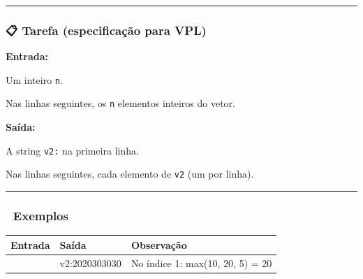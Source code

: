 \documentclass[
  portuguese,
  letterpaper,
  openany,
  oneside,
  12pt,
  a4paper]{book}
\begin{document}
\begin{tcolorbox}
\begin{center}\rule{0.5\linewidth}{0.5pt}\end{center}

\subsubsection{📋 Tarefa (especificação para
VPL)}\label{tarefa-especificauxe7uxe3o-para-vpl-8}

\textbf{Entrada:}

Um inteiro \texttt{n}.

Nas linhas seguintes, os \texttt{n} elementos inteiros do vetor.

\textbf{Saída:}

A string \texttt{v2:} na primeira linha.

Nas linhas seguintes, cada elemento de \texttt{v2} (um por linha).

\begin{center}\rule{0.5\linewidth}{0.5pt}\end{center}

\subsubsection{📌 Exemplos}\label{exemplos-8}

\begin{longtable}[]{@{}
  >{\raggedright\arraybackslash}p{}
  >{\raggedright\arraybackslash}p{}
  >{\raggedright\arraybackslash}p{}@{}}
\toprule\noalign{}
\begin{minipage}[b]{\linewidth}\raggedright
Entrada
\end{minipage} & \begin{minipage}[b]{\linewidth}\raggedright
Saída
\end{minipage} & \begin{minipage}[b]{\linewidth}\raggedright
Observação
\end{minipage} \\
\midrule\noalign{}
\endhead
\bottomrule\noalign{}
\endlastfoot
5102053015 & v2:2020303030 & No índice 1: max(10, 20, 5) = 20 \\
\end{longtable}

\begin{figure}[H]

\end{figure}
\end{tcolorbox}
\end{document}
